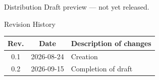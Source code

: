 \begin{adjustwidth}{5mm}{5mm}
\noindent
\begin{dsbox}{Distribution}
Draft preview --- not yet released.
\end{dsbox}

\noindent
\begin{dsbox}{Revision History}
\renewcommand{\arraystretch}{1.15}%
\noindent\begin{tabularx}{\linewidth}{|C{0.35}|C{0.55}|L{2.1}|}
\hline
\textbf{Rev.} & \textbf{Date} & \textbf{Description of changes} \\  & 2026-08-24 & Creation \\  & 2026-09-15 & Completion of draft \\ \hline
\end{tabularx}
\end{dsbox}

\end{adjustwidth}

